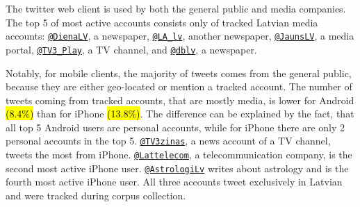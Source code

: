 \documentclass{IOS-Book-Article}
\makeatletter
\newcommand{\sn}[1]{\href{https://twitter.com/#1}{\texttt{@#1}}}
\makeatother
\begin{document}
The twitter web client is used by both the general public and media companies. The top 5 of most active accounts consists only of tracked Latvian media accounts: \sn{DienaLV}, a newspaper, \sn{LA\_lv}, another newspaper, \sn{JaunsLV}, a media portal, \sn{TV3\_Play}, a TV channel, and \sn{dblv}, a newspaper.

Notably, for mobile clients, the majority of tweets comes from the general public, because they are either geo-located or mention a tracked account. The number of tweets coming from tracked accounts, that are mostly media, is lower for Android \hl{(8.4\%)} than for iPhone \hl{(13.8\%)}. The difference can be explained by the fact, that all top 5 Android users are personal accounts, while for iPhone there are only 2 personal accounts in the top 5. \sn{TV3zinas}, a news account of a TV channel, tweets the most from iPhone. \sn{Lattelecom}, a telecommunication company, is the second most active iPhone user. \sn{AstrologiLv} writes about astrology and is the fourth most active iPhone user. All three accounts tweet exclusively in Latvian and were tracked during corpus collection.




\end{document}
